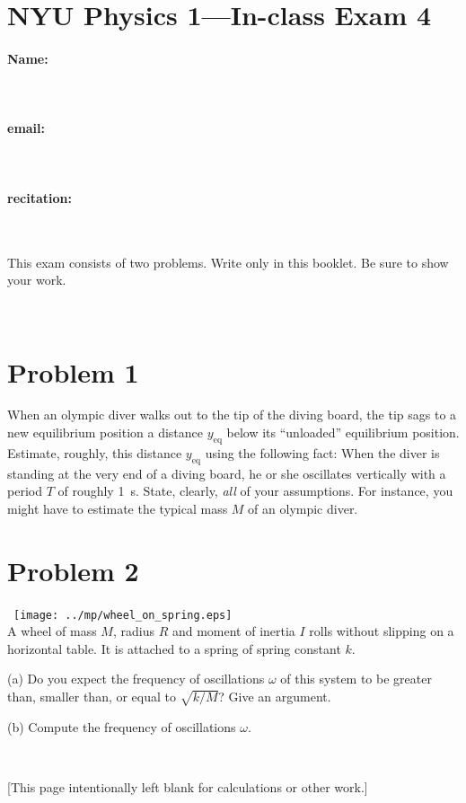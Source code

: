 \documentclass[12pt]{article}
\begin{document}
\section*{NYU Physics 1---In-class Exam 4}

\vfill

\paragraph{Name:} ~

\paragraph{email:} ~

\paragraph{recitation:} ~

\vfill

This exam consists of two problems.  Write only in this booklet.  Be
sure to show your work.

\vfill ~

\clearpage

\section*{Problem 1}

When an olympic diver walks out to the tip of the diving board, the
tip sags to a new equilibrium position a distance $y_\mathrm{eq}$
below its ``unloaded'' equilibrium position.  Estimate, roughly, this
distance $y_\mathrm{eq}$ using the following fact: When the diver is
standing at the very end of a diving board, he or she oscillates
vertically with a period $T$ of roughly 1~s.  State, clearly,
\emph{all} of your assumptions.  For instance, you might have to
estimate the typical mass $M$ of an olympic diver.

\clearpage

\section*{Problem 2}

\noindent~\hfill\texttt{[image: ../mp/wheel\_on\_spring.eps]}\hfill~\\
A wheel of mass $M$, radius $R$ and moment of inertia $I$ rolls
without slipping on a horizontal table.  It is attached to a spring of
spring constant $k$.

(a) Do you expect the frequency of oscillations $\omega$ of this
system to be greater than, smaller than, or equal to $\sqrt{k/M}$?
Give an argument.

\vfill

(b) Compute the frequency of oscillations $\omega$.

\vfill ~

\clearpage

[This page intentionally left blank for calculations or other work.]
\end{document}
